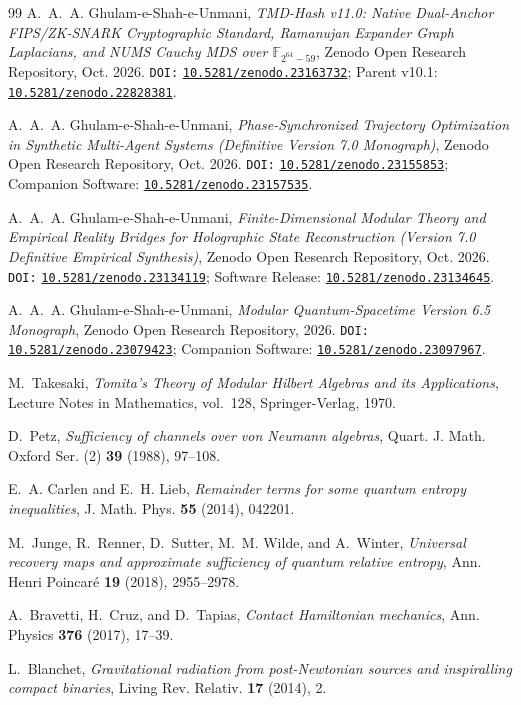 \documentclass[11pt,a4paper,reqno]{article}
\newcommand{\zenodo}[1]{\mbox{\href{https://doi.org/10.5281/zenodo.#1}{\texttt{10.5281/zenodo.#1}}}}
\theoremstyle{plain}
\theoremstyle{definition}
\theoremstyle{remark}
\numberwithin{equation}{section}
\begin{document}
\begin{thebibliography}{99}
A.~A.~A. Ghulam-e-Shah-e-Unmani, \emph{TMD-Hash v11.0: Native Dual-Anchor FIPS/ZK-SNARK Cryptographic Standard, Ramanujan Expander Graph Laplacians, and NUMS Cauchy MDS over $\mathbb{F}_{2^{64}-59}$}, Zenodo Open Research Repository, Oct. 2026. \texttt{DOI:} \zenodo{23163732}; Parent v10.1: \zenodo{22828381}.

A.~A.~A. Ghulam-e-Shah-e-Unmani, \emph{Phase-Synchronized Trajectory Optimization in Synthetic Multi-Agent Systems (Definitive Version 7.0 Monograph)}, Zenodo Open Research Repository, Oct. 2026. \texttt{DOI:} \zenodo{23155853}; Companion Software: \zenodo{23157535}.

A.~A.~A. Ghulam-e-Shah-e-Unmani, \emph{Finite-Dimensional Modular Theory and Empirical Reality Bridges for Holographic State Reconstruction (Version 7.0 Definitive Empirical Synthesis)}, Zenodo Open Research Repository, Oct. 2026. \texttt{DOI:} \zenodo{23134119}; Software Release: \zenodo{23134645}.

A.~A.~A. Ghulam-e-Shah-e-Unmani, \emph{Modular Quantum-Spacetime Version 6.5 Monograph}, Zenodo Open Research Repository, 2026. \texttt{DOI:} \zenodo{23079423}; Companion Software: \zenodo{23097967}.

M.~Takesaki, \emph{Tomita's Theory of Modular Hilbert Algebras and its Applications}, Lecture Notes in Mathematics, vol.~128, Springer-Verlag, 1970.

D.~Petz, \emph{Sufficiency of channels over von Neumann algebras}, Quart. J. Math. Oxford Ser. (2) \textbf{39} (1988), 97--108.

E.~A. Carlen and E.~H. Lieb, \emph{Remainder terms for some quantum entropy inequalities}, J. Math. Phys. \textbf{55} (2014), 042201.

M.~Junge, R.~Renner, D.~Sutter, M.~M. Wilde, and A.~Winter, \emph{Universal recovery maps and approximate sufficiency of quantum relative entropy}, Ann. Henri Poincar\'e \textbf{19} (2018), 2955--2978.

A.~Bravetti, H.~Cruz, and D.~Tapias, \emph{Contact Hamiltonian mechanics}, Ann. Physics \textbf{376} (2017), 17--39.

L.~Blanchet, \emph{Gravitational radiation from post-Newtonian sources and inspiralling compact binaries}, Living Rev. Relativ. \textbf{17} (2014), 2.


\end{thebibliography}
\end{document}
